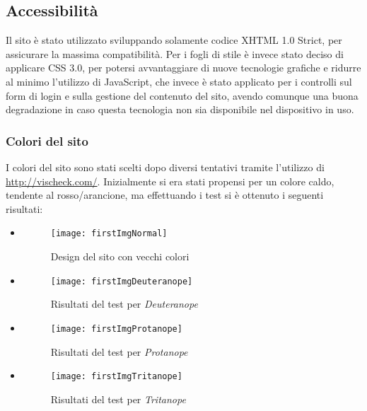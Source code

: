 \graphicspath{ {res/img/} }

\subsection{Accessibilità}
Il sito è stato utilizzato sviluppando solamente codice XHTML 1.0 Strict, per assicurare la massima compatibilità. Per i fogli di stile è invece stato deciso di applicare CSS 3.0, per potersi avvantaggiare di nuove tecnologie grafiche e ridurre al minimo l'utilizzo di JavaScript, che invece è stato applicato per i controlli sul form di login e sulla gestione del contenuto del sito, avendo comunque una buona degradazione in caso questa tecnologia non sia disponibile nel dispositivo in uso.

\subsubsection{Colori del sito}
I colori del sito sono stati scelti dopo diversi tentativi tramite l'utilizzo di \url{http://vischeck.com/}. Inizialmente si era stati propensi per un colore caldo, tendente al rosso/arancione, ma effettuando i test si è ottenuto i seguenti risultati:

\begin{itemize}

    \item[]
        \begin{figure}[H]

            \centering
            \texttt{[image: firstImgNormal]}
            \caption{Design del sito con vecchi colori}
        \end{figure}

    \item[]
        \begin{figure}[H]

            \centering
            \texttt{[image: firstImgDeuteranope]}
            \caption{Risultati del test per \textit{Deuteranope}}
        \end{figure}

    \item[]
        \begin{figure}[H]

            \centering
            \texttt{[image: firstImgProtanope]}
            \caption{Risultati del test per \textit{Protanope}}
        \end{figure}

    \item[]
        \begin{figure}[H]

            \centering
            \texttt{[image: firstImgTritanope]}
            \caption{Risultati del test per \textit{Tritanope}}
        \end{figure}

\end{itemize}

